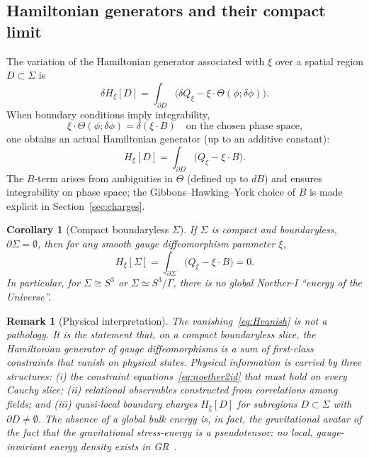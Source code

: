 \documentclass[12pt,a4paper]{article}
\newtheorem{corollary}[theorem]{Corollary}
\newtheorem{remark}{Remark}[section]
\newcommand{\Sig}{\Sigma}           %
\newcommand{\pa}{\partial}          %
\newcommand{\Qxi}{Q_\xi}
\newcommand{\Hxi}{H_\xi}
\begin{document}
\subsection{Hamiltonian generators and their compact limit}

The variation of the Hamiltonian generator associated
with $\xi$ over a spatial region $D\subset\Sig$ is
\begin{equation}
  \delta\Hxi[D]
  = \int_{\pa D}\!\!\bigl(\delta\Qxi - \xi\cdot\Theta(\phi;\delta\phi)\bigr).
  \label{eq:deltaH}
\end{equation}
When boundary conditions imply integrability,
\begin{equation}
  \xi\cdot\Theta(\phi;\delta\phi) = \delta(\xi\cdot B)
  \quad\text{on the chosen phase space,}
  \label{eq:integ}
\end{equation}
one obtains an actual Hamiltonian generator (up to an
additive constant):
\begin{equation}
  \Hxi[D] = \int_{\pa D}\!\!\bigl(\Qxi - \xi\cdot B\bigr).
  \label{eq:Hxi}
\end{equation}
The $B$-term arises from ambiguities in $\Theta$ (defined
up to $dB$) and ensures integrability on phase space; the
Gibbons--Hawking--York choice of $B$ is made explicit in
Section~\ref{sec:charges}.

\begin{corollary}[Compact boundaryless $\Sig$]
\label{cor:compact}
If $\Sig$ is compact and boundaryless, $\pa\Sig = \emptyset$,
then for any smooth gauge diffeomorphism parameter $\xi$,
\begin{equation}
  \Hxi[\Sig] = \int_{\pa\Sig}\!\!\bigl(\Qxi - \xi\cdot B\bigr) = 0.
  \label{eq:Hvanish}
\end{equation}
In particular, for $\Sig \cong S^3$ or $\Sig \simeq S^3/\Gamma$,
there is no global Noether-I ``energy of the Universe''.
\end{corollary}

\begin{remark}[Physical interpretation]
The vanishing~\eqref{eq:Hvanish} is not a pathology.
It is the statement that, on a compact boundaryless slice,
the Hamiltonian generator of gauge diffeomorphisms is
a sum of first-class constraints that vanish on physical
states. Physical information is carried by three structures:
(i) the constraint equations~\eqref{eq:noether2id} that
must hold on every Cauchy slice; (ii) relational observables
constructed from correlations among fields; and (iii) quasi-local
boundary charges $\Hxi[D]$ for subregions $D\subset\Sig$
with $\pa D \neq \emptyset$. The absence of a global
bulk energy is, in fact, the gravitational avatar of the
fact that the gravitational stress-energy is a
pseudotensor: no local, gauge-invariant energy density
exists in GR~\cite{Wald1984}.
\end{remark}
\end{document}
